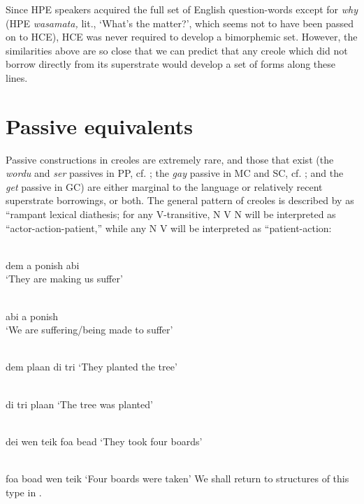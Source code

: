 Since HPE speakers acquired the full set of English question-words except for \textit{why} (HPE \textit{wasamata,} lit., `What's the matter?', which seems not to have been passed on to HCE), HCE was never required to develop a bimorphemic set. However, the similarities above are so close that we can predict that any creole which did not borrow directly from its superstrate would develop a set of forms along these lines.

\section{Passive equivalents}

Passive constructions in creoles are extremely rare, and those that exist (the \textit{wordu} and \textit{ser} passives in PP, cf. \citealt{MarkeyEtAl1980}; the \textit{gay} passive in MC and SC, cf. \citealt{Corne1977}; and the \textit{get} passive in
GC) are either marginal to the language or relatively recent super\-strate borrowings, or both. The general pattern of creoles is described by \citet{MarkeyEtAl1980} as ``rampant lexical diathesis{\textquotedbl}; for any V-transitive, N V N will be interpreted as ``actor-action-patient,'' while any N V will be interpreted as ``patient-action{\textquotedbl}:

\ea\label{ex:2:86}
 \langinfo{\langGC}{}{}\\
 dem a ponish abi\\
\glt `They are making us suffer'
\z

\ea\label{ex:2:87}
\langinfo{\langGC}{}{}\\
abi a ponish\\
\glt `We are suffering/being made to suffer'
\z

\ea\label{ex:2:88}
 \langinfo{\langJC}{}{}\\
  dem plaan di tri
\glt `They planted the tree'
\z

\ea\label{ex:2:89}
\langinfo{\langJC}{}{}\\
di tri plaan
\glt `The tree was planted'
\z

\ea\label{ex:2:90}
 \langinfo{\langHCE}{}{}\\
 dei wen teik foa bead
\glt `They took four boards'
\z

\ea\label{ex:2:91}
\langinfo{\langHCE}{}{}\\
foa boad wen teik
\glt `Four boards were taken'
\z
We shall return to structures of this type in .\\\\

